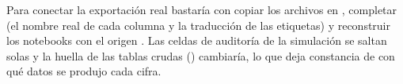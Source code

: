 Para conectar la exportación real bastaría con copiar los archivos en
, completar 
(el nombre real de cada columna y la traducción de las etiquetas) y
reconstruir los notebooks con el origen . Las celdas de
auditoría de la simulación se saltan solas y la huella de las tablas crudas
(\codigo{\DatHuella}) cambiaría, lo que deja constancia de con qué datos se
produjo cada cifra.
